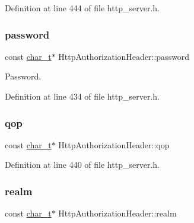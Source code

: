 Definition at line 444 of file http\+\_\+server.\+h.

\mbox{\label{structHttpAuthorizationHeader_aee82edefb89b600f4cd02d20e060c81f}} 
\subsubsection{\texorpdfstring{password}{password}}
{\footnotesize\ttfamily const \hyperlink{compiler__port_8h_a40bb5262bf908c328fbcfbe5d29d0201}{char\+\_\+t}$\ast$ Http\+Authorization\+Header\+::password}



Password. 



Definition at line 434 of file http\+\_\+server.\+h.

\mbox{\label{structHttpAuthorizationHeader_aa4898fb5e5bf52971ec735c9111ce9dd}} 
\subsubsection{\texorpdfstring{qop}{qop}}
{\footnotesize\ttfamily const \hyperlink{compiler__port_8h_a40bb5262bf908c328fbcfbe5d29d0201}{char\+\_\+t}$\ast$ Http\+Authorization\+Header\+::qop}



Definition at line 440 of file http\+\_\+server.\+h.

\mbox{\label{structHttpAuthorizationHeader_a1a9b313d0b2bcb0f2de620d87f3638cf}} 
\subsubsection{\texorpdfstring{realm}{realm}}
{\footnotesize\ttfamily const \hyperlink{compiler__port_8h_a40bb5262bf908c328fbcfbe5d29d0201}{char\+\_\+t}$\ast$ Http\+Authorization\+Header\+::realm}



